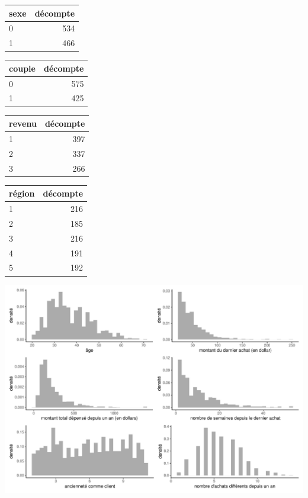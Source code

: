 \documentclass[
  ignorenonframetext,
]{beamer}
\begin{document}
\begin{frame}
\begin{table}

\begin{tabular}{lr}
\toprule
sexe & décompte\\
\midrule
0 & 534\\
1 & 466\\
\bottomrule
\end{tabular}
\begin{tabular}{lr}
\toprule
couple & décompte\\
\midrule
0 & 575\\
1 & 425\\
\bottomrule
\end{tabular}
\end{table}

\begin{table}

\begin{tabular}{lr}
\toprule
revenu & décompte\\
\midrule
1 & 397\\
2 & 337\\
3 & 266\\
\bottomrule
\end{tabular}
\begin{tabular}{lr}
\toprule
région & décompte\\
\midrule
1 & 216\\
2 & 185\\
3 & 216\\
4 & 191\\
5 & 192\\
\bottomrule
\end{tabular}
\end{table}
\end{frame}

\begin{frame}
\includegraphics[width=1\textwidth,height=\textheight]{MATH60602-diapos4_files/figure-beamer/histogrammes-eda-dbm-fig-1.pdf}
\end{frame}
\end{document}
